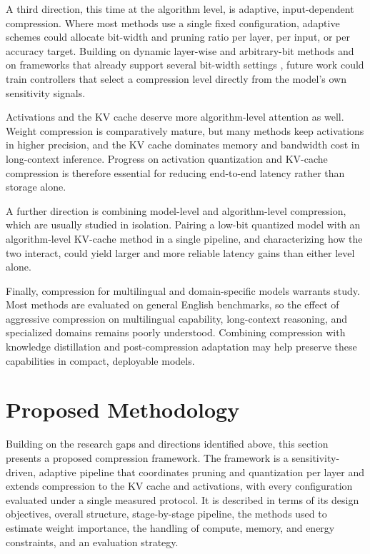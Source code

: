A third direction, this time at the algorithm level, is adaptive, input-dependent compression. Where most methods use a single fixed configuration, adaptive schemes could allocate bit-width and pruning ratio per layer, per input, or per accuracy target. Building on dynamic layer-wise and arbitrary-bit methods \cite{xu2026daypq,zeng2025abqllm} and on frameworks that already support several bit-width settings \cite{shao2024omniquant}, future work could train controllers that select a compression level directly from the model's own sensitivity signals.

Activations and the KV cache deserve more algorithm-level attention as well. Weight compression is comparatively mature, but many methods keep activations in higher precision, and the KV cache dominates memory and bandwidth cost in long-context inference. Progress on activation quantization \cite{xiao2023smoothquant,yuan2023rptq} and KV-cache compression \cite{zhang2023h2o,hooper2024kvquant,li2024snapkv} is therefore essential for reducing end-to-end latency rather than storage alone.

A further direction is combining model-level and algorithm-level compression, which are usually studied in isolation. Pairing a low-bit quantized model with an algorithm-level KV-cache method \cite{zhang2023h2o,hooper2024kvquant,ashkboos2024quarot} in a single pipeline, and characterizing how the two interact, could yield larger and more reliable latency gains than either level alone.

Finally, compression for multilingual and domain-specific models warrants study. Most methods are evaluated on general English benchmarks, so the effect of aggressive compression on multilingual capability, long-context reasoning, and specialized domains remains poorly understood. Combining compression with knowledge distillation and post-compression adaptation \cite{hsieh2023distilling,malinovskii2024pvtuning,muralidharan2024minitron} may help preserve these capabilities in compact, deployable models.

\section{Proposed Methodology}
\label{sec:lr-proposed}

Building on the research gaps and directions identified above, this section presents a proposed compression framework. The framework is a sensitivity-driven, adaptive pipeline that coordinates pruning and quantization per layer and extends compression to the KV cache and activations, with every configuration evaluated under a single measured protocol. It is described in terms of its design objectives, overall structure, stage-by-stage pipeline, the methods used to estimate weight importance, the handling of compute, memory, and energy constraints, and an evaluation strategy.

